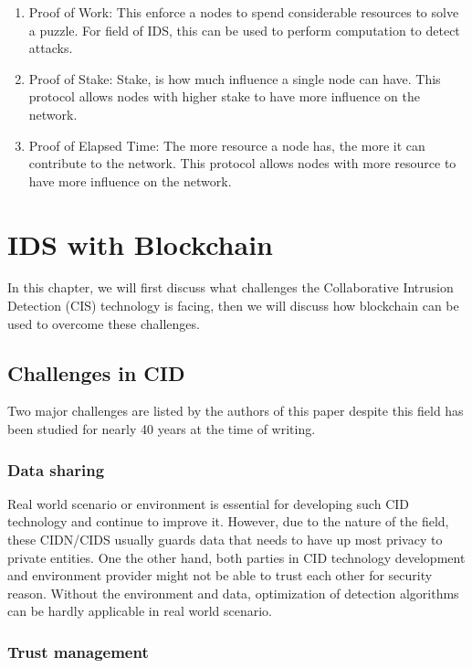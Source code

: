\documentclass[12pt]{report}
\begin{document}
\begin{enumerate}
	\item{Proof of Work}: This enforce a nodes to spend considerable resources to solve a puzzle. For field of IDS, this can be used to perform computation to detect attacks.
	\item{Proof of Stake}: Stake, is how much influence a single node can have. This protocol allows nodes with higher stake to have more influence on the network.
	\item{Proof of Elapsed Time}: The more resource a node has, the more it can contribute to the network. This protocol allows nodes with more resource to have more influence on the network.
\end{enumerate}

\chapter{IDS with Blockchain}

In this chapter, we will first discuss what challenges the Collaborative Intrusion Detection (CIS) technology is facing, then we will discuss how blockchain can be used to overcome these challenges.

\section{Challenges in CID}

Two major challenges are listed by the authors of this paper despite this field has been studied for nearly 40 years at the time of writing.

\subsection{Data sharing}

Real world scenario or environment is essential for developing such CID technology and continue to improve it. However, due to the nature of the field, these CIDN/CIDS usually guards data that needs to have up most privacy to private entities. One the other hand, both parties in CID technology development and environment provider might not be able to trust each other for security reason. Without the environment and data, optimization of detection algorithms can be hardly applicable in real world scenario.

\subsection{Trust management}
\end{document}
